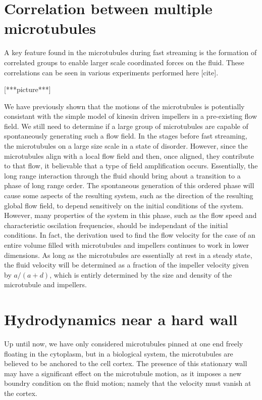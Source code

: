\documentclass[11pt]{ucthesis}
\begin{document}
\section{Correlation between multiple microtubules}
A key feature found in the microtubules during fast streaming is the formation of correlated groups to enable larger scale coordinated forces on the fluid. These correlations can be seen in various experiments performed here [cite].

[***picture***]

We have previously shown that the motions of the microtubules is potentially consistant with the simple model of kinesin driven impellers in a pre-existing flow field. We still need to determine if a large group of microtubules are capable of spontaneously generating such a flow field.
In the stages before fast streaming, the microtubules on a large size scale in a state of disorder. However, since the microtubules align with a local flow field and then, once aligned, they contribute to that flow, it believable that a type of field amplification occurs.
Essentially, the long range interaction through the fluid should bring about a transition to a phase of long range order.
The spontaneous generation of this ordered phase will cause some aspects of the resulting system, such as the direction of the resulting global flow field, to depend sensitively on the initial conditions of the system.
However, many properties of the system in this phase, such as the flow speed and characteristic oscilation frequencies, should be independant of the initial conditions.
In fact, the derivation used to find the flow velocity for the case of an entire volume filled with microtubules and impellers continues to work in lower dimensions.
As long as the microtubules are essentially at rest in a steady state, the fluid velocity will be determined as a fraction of the impeller velocity given by $a/(a+d)$, which is entirly determined by the size and density of the microtubule and impellers.

\section{Hydrodynamics near a hard wall}
Up until now, we have only considered microtubules pinned at one end freely floating in the cytoplasm, but in a biological system, the microtubules are believed to be anchored to the cell cortex. 
The presence of this stationary wall may have a significant effect on the microtubule motion, as it imposes a new boundry condition on the fluid motion; namely that the velocity must vanish at the cortex.
\end{document}
